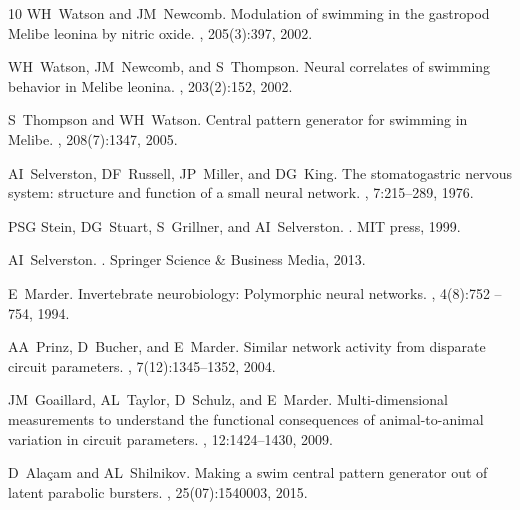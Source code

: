 \documentclass[nofootinbib,aip,amsmath,amssymb,preprint,twocolumn,floatfix,10pt]{revtex4-2}
\begin{document}
\begin{thebibliography}{10}
WH~Watson and JM~Newcomb.
\newblock Modulation of swimming in the gastropod Melibe leonina by nitric
  oxide.
, 205(3):397, 2002.

WH~Watson, JM~Newcomb, and S~Thompson.
\newblock Neural correlates of swimming behavior in Melibe leonina.
, 203(2):152, 2002.

S~Thompson and WH~Watson.
\newblock Central pattern generator for swimming in Melibe.
, 208(7):1347, 2005.


AI~Selverston, DF~Russell, JP~Miller, and DG~King.
\newblock The stomatogastric nervous system: structure and function of a small
  neural network.
, 7:215--289, 1976.

PSG Stein, DG~Stuart, S~Grillner, and AI~Selverston.
.
\newblock MIT press, 1999.

AI~Selverston.
.
\newblock Springer Science \& Business Media, 2013.

E~Marder.
\newblock Invertebrate neurobiology: Polymorphic neural networks.
, 4(8):752 -- 754, 1994.


AA~Prinz, D~Bucher, and E~Marder.
\newblock Similar network activity from disparate circuit parameters.
, 7(12):1345--1352, 2004.

JM~Goaillard, AL~Taylor, D~Schulz, and E~Marder.
\newblock Multi-dimensional measurements to understand the functional
  consequences of animal-to-animal variation in circuit parameters.
, 12:1424--1430, 2009.

D~Ala\c{c}am and AL~Shilnikov.
\newblock Making a swim central pattern generator out of latent parabolic
  bursters.
, 25(07):1540003,
  2015.




\end{thebibliography}
\end{document}
